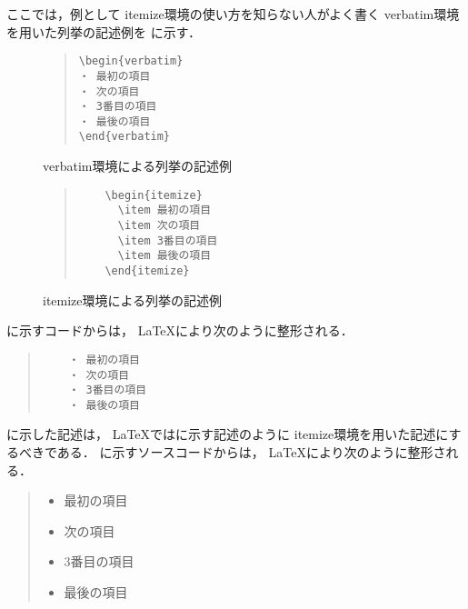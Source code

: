 \documentclass{jarticle}[11pt]
\newcommand{\figref}[1]{\makebox{図~\ref{#1}}}
\begin{document}
    ここでは，例として itemize環境の使い方を知らない人がよく書く
    verbatim環境を用いた列挙の記述例を
    \figref{fig:verbatim環境による列挙の記述例}に示す．
    \begin{figure}[tb]
    \begin{center}
    \begin{quote}
    \verb|\begin{verbatim}| \\
    \verb|・ 最初の項目| \\
    \verb|・ 次の項目| \\
    \verb|・ 3番目の項目| \\
    \verb|・ 最後の項目| \\
    \verb|\end{verbatim}|
    \end{quote}
    \caption{verbatim環境による列挙の記述例}
    \label{fig:verbatim環境による列挙の記述例}
    \end{center}
    \end{figure}
    \begin{figure}[tb]
    \begin{quote}
    \begin{verbatim}
    \begin{itemize}
      \item 最初の項目
      \item 次の項目
      \item 3番目の項目
      \item 最後の項目
    \end{itemize}
    \end{verbatim}
    \end{quote}
    \caption{itemize環境による列挙の記述例}
    \label{fig:itemize環境による列挙の記述例}
    \end{figure}
    \figref{fig:verbatim環境による列挙の記述例}に示すコードからは，
    \LaTeX により次のように整形される．
    \begin{quote}
    \begin{verbatim}
    ・ 最初の項目
    ・ 次の項目
    ・ 3番目の項目
    ・ 最後の項目
    \end{verbatim}
    \end{quote}
     
    \figref{fig:verbatim環境による列挙の記述例}に示した記述は，
    \LaTeX では\figref{fig:itemize環境による列挙の記述例}に示す記述のように
    itemize環境を用いた記述にするべきである．
    \figref{fig:itemize環境による列挙の記述例}に示すソースコードからは，
    \LaTeX により次のように整形される．
    \begin{quote}
    \begin{itemize}
      \item 最初の項目
      \item 次の項目
      \item 3番目の項目
      \item 最後の項目
    \end{itemize}
    \end{quote}
     
\end{document}
